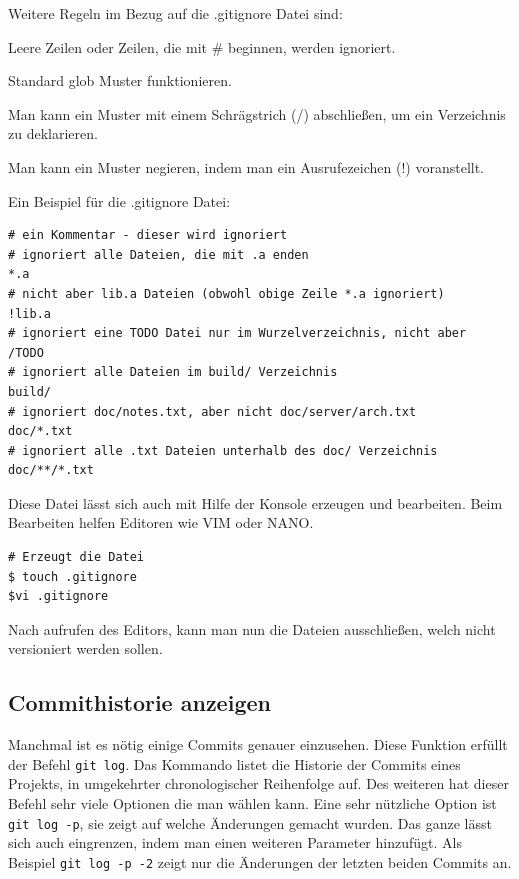 \documentclass[12pt,a4paper,bibliography=totocnumbered,listof=totocnumbered]{scrartcl}
\begin{document}
Weitere Regeln im Bezug auf die .gitignore Datei sind:

\begin{compactitem}
	\item Leere Zeilen oder Zeilen, die mit # beginnen, werden 			     ignoriert.
	\item Standard glob Muster funktionieren.
	\item Man kann ein Muster mit einem Schrägstrich (/) abschließen, um ein Verzeichnis zu deklarieren.
	\item  Man kann ein Muster negieren, indem man ein Ausrufezeichen (!) voranstellt.
\end{compactitem}

Ein Beispiel für die .gitignore Datei:
\vspace{1em}
\begin{lstlisting}[caption=Git Einstellungen der.gitignore Datei, label=lst:arduino]
# ein Kommentar - dieser wird ignoriert
# ignoriert alle Dateien, die mit .a enden
*.a
# nicht aber lib.a Dateien (obwohl obige Zeile *.a ignoriert)
!lib.a
# ignoriert eine TODO Datei nur im Wurzelverzeichnis, nicht aber
/TODO
# ignoriert alle Dateien im build/ Verzeichnis
build/
# ignoriert doc/notes.txt, aber nicht doc/server/arch.txt
doc/*.txt
# ignoriert alle .txt Dateien unterhalb des doc/ Verzeichnis
doc/**/*.txt
\end{lstlisting}

Diese Datei lässt sich auch mit Hilfe der Konsole erzeugen und bearbeiten. Beim Bearbeiten helfen Editoren wie VIM oder NANO. 
\vspace{1em}
\begin{lstlisting}[caption=Git Erstellen der.gitignore Datei, label=lst:arduino]
# Erzeugt die Datei 
$ touch .gitignore
$vi .gitignore
\end{lstlisting}

Nach aufrufen des Editors, kann man nun die Dateien ausschließen, welch nicht versioniert werden sollen.
 

\subsection{Commithistorie anzeigen}
Manchmal ist es nötig einige Commits genauer einzusehen. Diese Funktion erfüllt der Befehl  \lstinline|git log|. Das Kommando listet die Historie der Commits eines Projekts, in umgekehrter chronologischer Reihenfolge auf. Des weiteren hat dieser Befehl sehr viele Optionen die man wählen kann. Eine sehr nützliche Option ist \lstinline|git log -p|, sie zeigt auf welche Änderungen gemacht wurden. Das ganze lässt sich auch eingrenzen, indem man einen weiteren Parameter hinzufügt. Als Beispiel \lstinline|git log -p -2| zeigt nur die Änderungen der letzten beiden Commits an.
\end{document}
